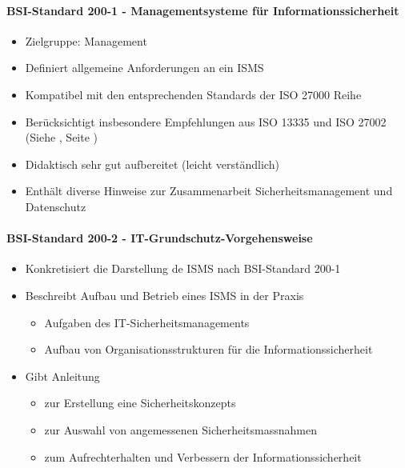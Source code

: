 \documentclass[10pt,a4paper]{article}
\begin{document}
\paragraph*{BSI-Standard 200-1 - Managementsysteme für Informationssicherheit}\label{para:BSI 200-1}
\begin{itemize}[noitemsep,topsep=0pt,leftmargin=*]
    \item Zielgruppe: Management
    \item Definiert allgemeine Anforderungen an ein ISMS
    \item Kompatibel mit den entsprechenden Standards der ISO 27000 Reihe
    \item Berücksichtigt insbesondere Empfehlungen aus ISO 13335 und ISO 27002\\({Siehe \underline{}, Seite \pageref{para:ISO 27002}})
    \item Didaktisch sehr gut aufbereitet (leicht verständlich)
    \item Enthält diverse Hinweise zur Zusammenarbeit Sicherheitsmanagement und Datenschutz
\end{itemize}

\paragraph*{BSI-Standard 200-2 - IT-Grundschutz-Vorgehensweise}\label{para:BSI 200-2}
\begin{itemize}[noitemsep,topsep=0pt,leftmargin=*]
    \item Konkretisiert die Darstellung de ISMS nach BSI-Standard 200-1
    \item Beschreibt Aufbau und Betrieb eines ISMS in der Praxis
    \begin{itemize}[noitemsep,topsep=0pt,leftmargin=*]
        \item Aufgaben des IT-Sicherheitsmanagements
        \item Aufbau von Organisationsstrukturen für die Informationssicherheit
    \end{itemize}
    \item Gibt Anleitung
    \begin{itemize}[noitemsep,topsep=0pt,leftmargin=*]
        \item zur Erstellung eine Sicherheitskonzepts
        \item zur Auswahl von angemessenen Sicherheitsmassnahmen
        \item zum Aufrechterhalten und Verbessern der Informationssicherheit
    \end{itemize}
\end{itemize}
\end{document}
